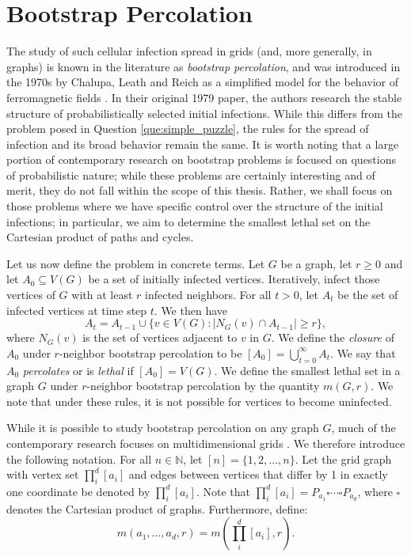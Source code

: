 \section{Bootstrap Percolation}

The study of such cellular infection spread in grids (and, more generally, in graphs) is known in the literature as \emph{bootstrap percolation}, and was introduced in the 1970s by Chalupa, Leath and Reich as a simplified model for the behavior of ferromagnetic fields \cite{chalupa:1979}. In their original 1979 paper, the authors research the stable structure of probabilistically selected initial infections. While this differs from the problem posed in Question \ref{que:simple_puzzle}, the rules for the spread of infection and its broad behavior remain the same. It is worth noting that a large portion of contemporary research on bootstrap problems is focused on questions of probabilistic nature; while these problems are certainly interesting and of merit, they do not fall within the scope of this thesis. Rather, we shall focus on those problems where we have specific control over the structure of the initial infections; in particular, we aim to determine the smallest lethal set on the Cartesian product of paths and cycles. 

Let us now define the problem in concrete terms. Let $G$ be a graph, let $r \geq 0$ and let $A_0 \subseteq V(G)$ be a set of initially infected vertices. Iteratively, infect those vertices of $G$ with at least $r$ infected neighbors. For all $t > 0$, let $A_t$ be the set of infected vertices at time step $t$. We then have
$$A_t = A_{t-1} \cup \{v \in V(G) : |N_G(v) \cap A_{t-1}| \geq r\},$$
where $N_G(v)$ is the set of vertices adjacent to $v$ in $G$. We define the \emph{closure} of $A_0$ under $r$-neighbor bootstrap percolation to be $[A_0] = \bigcup_{t=0}^{\infty} A_t$. We say that $A_0$ \emph{percolates} or is \emph{lethal} if $[A_0] = V(G)$. We define the smallest lethal set in a graph $G$ under $r$-neighbor bootstrap percolation by the quantity $m(G,r)$. We note that under these rules, it is not possible for vertices to become uninfected.

While it is possible to study bootstrap percolation on any graph $G$, much of the contemporary research focuses on multidimensional grids \cite{pete:1997,przykucki:2019,balogh:2006,benevides:2021,benevides2015maximum,benevides2013slowly,pete1997make,balogh2012sharp,balogh2009bootstrap,balogh2009majority,balogh2010bootstrap}. We therefore introduce the following notation. For all $n \in \mathbb{N}$, let $[n] = \{1, 2, \dots, n\}$. Let the grid graph with vertex set $\prod_i^d [a_i]$ and edges between vertices that differ by 1 in exactly one coordinate be denoted by $\prod_i^d [a_i]$. Note that $\prod_i^d [a_i] = P_{a_1} \square \cdots \square P_{a_d}$, where $\square$ denotes the Cartesian product of graphs. Furthermore, define:
$$m(a_1, \dots, a_d, r) = m\left(\prod_i^d [a_i], r\right).$$

